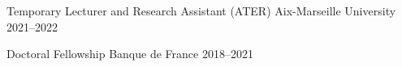 

\begin{cvhonors}
  \cvhonor
    {Temporary Lecturer and Research Assistant (ATER)} %
    {} %
    {Aix-Marseille University} %
    {2021--2022} %
    
  \cvhonor
    {Doctoral Fellowship} %
    {} %
    {Banque de France} %
    {2018--2021} %
\end{cvhonors}